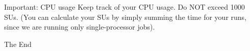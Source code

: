 \documentclass[aspectratio=169]{beamer}
\begin{document}
    \begin{frame}{Important: CPU usage}
        Keep track of your CPU usage.\newline
        \newline
        Do NOT exceed 1000 SUs. (You can calculate your SUs by simply summing the time for your runs, since we are running only single-processor jobs).
    \end{frame}


%     
%     

    \begin{frame}
        \Huge{\centerline{The End}}
    \end{frame}
\end{document}
